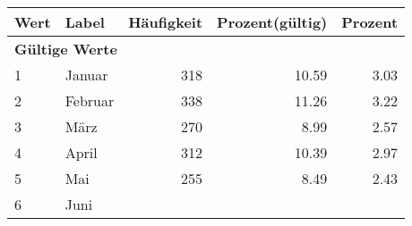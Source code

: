      \begin{longtable}{lXrrr}
     \toprule
     \textbf{Wert} & \textbf{Label} & \textbf{Häufigkeit} & \textbf{Prozent(gültig)} & \textbf{Prozent} \\
     \endhead
     \midrule
     \multicolumn{5}{l}{\textbf{Gültige Werte}}\\

     1 &
     \multicolumn{1}{X}{ Januar   } &


       \num{318} &
       \num[round-mode=places,round-precision=2]{10.59} &
         \num[round-mode=places,round-precision=2]{3.03} \\

     2 &
     \multicolumn{1}{X}{ Februar   } &


       \num{338} &
       \num[round-mode=places,round-precision=2]{11.26} &
         \num[round-mode=places,round-precision=2]{3.22} \\

     3 &
     \multicolumn{1}{X}{ März   } &


       \num{270} &
       \num[round-mode=places,round-precision=2]{8.99} &
         \num[round-mode=places,round-precision=2]{2.57} \\

     4 &
     \multicolumn{1}{X}{ April   } &


       \num{312} &
       \num[round-mode=places,round-precision=2]{10.39} &
         \num[round-mode=places,round-precision=2]{2.97} \\

     5 &
     \multicolumn{1}{X}{ Mai   } &


       \num{255} &
       \num[round-mode=places,round-precision=2]{8.49} &
         \num[round-mode=places,round-precision=2]{2.43} \\

     6 &
     \multicolumn{1}{X}{ Juni   } &



\end{longtable}

